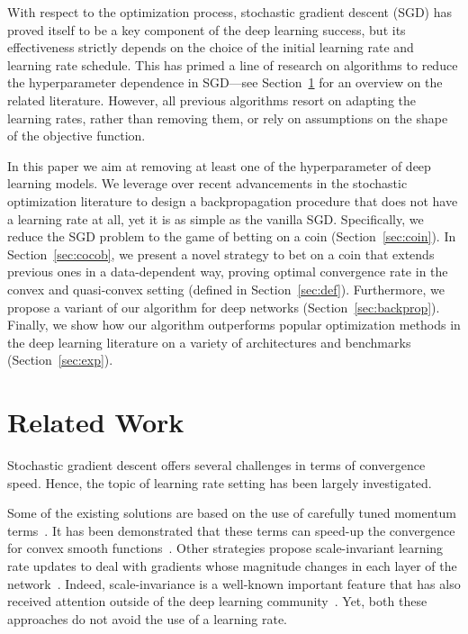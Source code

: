 \documentclass{article}
\begin{document}
With respect to the optimization process, stochastic gradient descent (SGD) has proved itself to be 
a key component of the deep learning success, but its effectiveness strictly depends on the choice of
the initial learning rate and learning rate schedule. This has primed a line of research on algorithms
to reduce the hyperparameter dependence in SGD---see Section~\ref{sec:rel} for an overview on the related literature. However,
all previous algorithms resort on adapting the learning rates, rather than removing them, or rely on assumptions on the shape of the objective function.

In this paper we aim at removing at least one of the hyperparameter of deep learning models. We leverage over recent advancements in the stochastic optimization literature to design 
a backpropagation procedure that does not have a learning rate at all, yet it is as simple as the vanilla SGD.
Specifically, we reduce the SGD problem to the game of betting on a coin (Section~\ref{sec:coin}). 
In Section~\ref{sec:cocob}, we present a novel strategy to bet on a coin that extends previous ones in a data-dependent way, 
proving optimal convergence rate in the convex and quasi-convex setting (defined in Section~\ref{sec:def}). 
Furthermore, we propose a variant of our algorithm for deep networks (Section~\ref{sec:backprop}). 
Finally, we show how our algorithm outperforms popular optimization methods in the deep learning 
literature on a variety of architectures and benchmarks (Section~\ref{sec:exp}).

 \section{Related Work}
\label{sec:rel}

Stochastic gradient descent offers several challenges in terms of convergence speed.
Hence, the topic of learning rate setting has been largely investigated.

Some of the existing solutions are based on the use of carefully tuned momentum terms~\citep{LeCunBOM98,SutskeverMDH13,KingmaB15}.
It has been demonstrated that these terms can speed-up the convergence for convex smooth functions~\citep{Nesterov83}.
Other strategies propose scale-invariant learning rate updates to deal with gradients whose magnitude
changes in each layer of the network~\citep{DuchiHS11,TielemanH12,Zeiler12,KingmaB15}. Indeed, scale-invariance is a
well-known important feature that has also received attention outside of the deep learning community~\citep{RossML13,OrabonaCCB15,OrabonaP15}.
Yet, both these approaches do not avoid the use of a learning rate.
\end{document}
